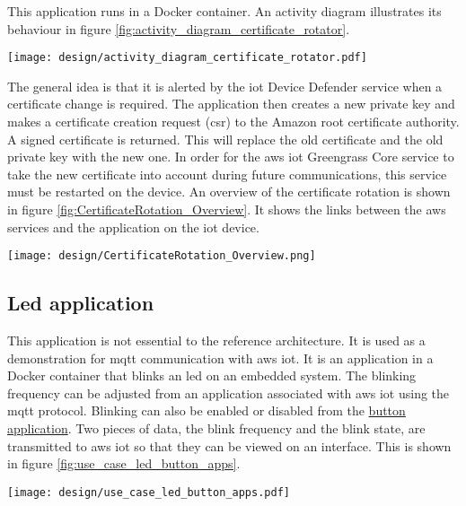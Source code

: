 This application runs in a Docker container. An activity diagram illustrates its behaviour in figure \ref{fig:activity_diagram_certificate_rotator}.
\begin{center}
    \begingroup
    \texttt{[image: design/activity\_diagram\_certificate\_rotator.pdf]}
    \label{fig:activity_diagram_certificate_rotator}
    \endgroup
\end{center}
The general idea is that it is alerted by the \acrshort{iot} Device Defender service when a certificate change is required. The application then creates a new private key and makes a certificate creation request (\acrfull{csr}) to the Amazon root certificate authority. A signed certificate is returned. This will replace the old certificate and the old private key with the new one. In order for the \gls{aws} \acrshort{iot} Greengrass Core service to take the new certificate into account during future communications, this service must be restarted on the device. An overview of the certificate rotation is shown in figure \ref{fig:CertificateRotation_Overview}. It shows the links between the \gls{aws} services and the application on the \acrshort{iot} device.
\begin{center}
    \begingroup
    \texttt{[image: design/CertificateRotation\_Overview.png]}
    \label{fig:CertificateRotation_Overview}
    \endgroup
\end{center}

\subsection{Led application}
\label{subsec:led_app}
This application is not essential to the reference architecture. It is used as a demonstration for \acrshort{mqtt} communication with \gls{aws} \acrshort{iot}. It is an application in a Docker container that blinks an led on an embedded system. The blinking frequency can be adjusted from an application associated with \gls{aws} \acrshort{iot} using the \acrshort{mqtt} protocol. Blinking can also be enabled or disabled from the \hyperref[subsec:button_app]{button application}. Two pieces of data, the blink frequency and the blink state, are transmitted to \gls{aws} \acrshort{iot} so that they can be viewed on an interface. This is shown in figure \ref{fig:use_case_led_button_apps}.
\begin{center}
    \begingroup
    \texttt{[image: design/use\_case\_led\_button\_apps.pdf]}
    \label{fig:use_case_led_button_apps}
    \endgroup
\end{center}

